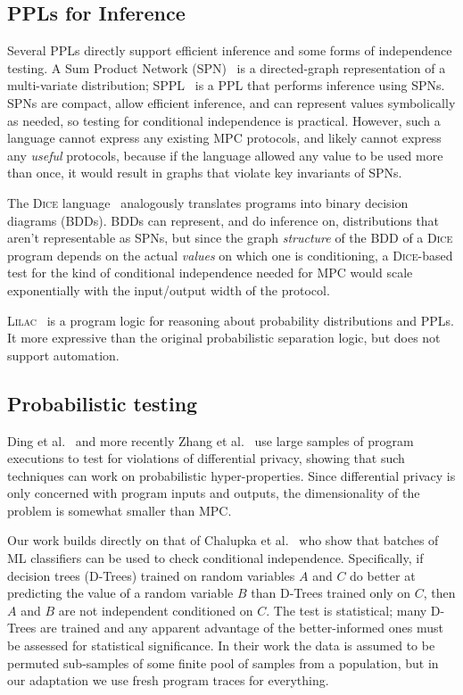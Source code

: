 \documentclass[acmlarge, manuscript, screen, review, anonymous, table]{acmart}
\begin{document}
\subsection{PPLs for Inference}

Several PPLs directly support efficient inference and some forms of independence testing.
A Sum Product Network (SPN)~\cite{poon2011sum} is a directed-graph representation of a multi-variate distribution;
SPPL~\cite{saad2021sppl} is a PPL that performs inference using SPNs.
SPNs are compact, allow efficient inference, and can represent values symbolically as needed,
so testing for conditional independence is practical.
However, such a language cannot express any existing MPC protocols, and likely cannot express any \emph{useful} protocols,
because if the language allowed any value to be used more than once, it would result in graphs that violate key invariants of SPNs.

The \textsc{Dice} language~\cite{holtzen2020scaling} analogously translates programs into binary decision diagrams (BDDs).
BDDs can represent, and do inference on, distributions that aren't representable as SPNs,
but since the graph \emph{structure} of the BDD of a \textsc{Dice} program depends on the actual \emph{values} on which one is conditioning,
a \textsc{Dice}-based test for the kind of conditional independence needed for MPC would scale exponentially with the input/output width of the protocol.

\textsc{Lilac}~\cite{li2023lilac} %
is a program logic for reasoning about probability distributions and PPLs.
It more expressive than the original probabilistic separation logic,
but does not support automation.


\subsection{Probabilistic testing}

Ding et al.~\cite{ding2018detecting} %
and more recently Zhang et al.~\cite{zhang2020testing} %
use large samples of program executions to test for violations of differential privacy,
showing that such techniques can work on probabilistic hyper-properties.
Since differential privacy is only concerned with program inputs and outputs,
the dimensionality of the problem is somewhat smaller than MPC.

Our work builds directly on that of Chalupka et al.~\cite{chalupka2018fast}
who show that batches of ML classifiers can be used to check conditional independence.
Specifically, if decision trees (D-Trees) trained on random variables $A$ and $C$
do better at predicting the value of a random variable $B$ than D-Trees trained only on $C$,
then $A$ and $B$ are not independent conditioned on $C$.
The test is statistical; many D-Trees are trained and any apparent advantage of the better-informed ones must be assessed for statistical significance.
In their work the data is assumed to be permuted sub-samples of some finite pool of samples from a population,
but in our adaptation we use fresh program traces for everything.
\end{document}
